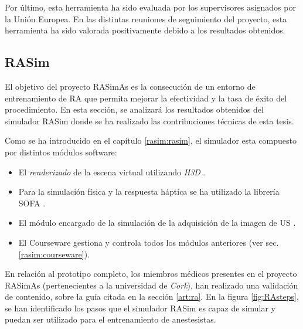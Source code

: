 Por último, esta herramienta ha sido evaluada por los supervisores asignados por la Unión Europea. En las distintas reuniones de seguimiento del proyecto, esta herramienta ha sido valorada positivamente debido a los resultados obtenidos.




\subsection{RASim}
\label{result:rasim}

El objetivo del proyecto \ac{RASimAs} es la consecución de un entorno de entrenamiento de \ac{RA} que permita mejorar la efectividad y la tasa de éxito del procedimiento.  En esta sección, se analizará los resultados obtenidos del simulador \ac{RASim} donde se ha realizado las contribuciones técnicas de esta tesis.

Como se ha introducido en el capítulo \ref{rasim:rasim}, el simulador esta compuesto por distintos módulos software:

\begin{itemize}
    \item El \emph{renderizado} de la escena virtual utilizando \emph{H3D} \cite{sensegraphics2012open}.
    \item Para la simulación física y la respuesta háptica\cite{needleinsertion} se ha utilizado la librería \ac{SOFA} \cite{sofaweb}.
    \item El módulo encargado de la simulación de la adquisición de la imagen de \ac{US} \cite{Law2015}.
    \item El \ac{Courseware} gestiona y controla todos los módulos anteriores (ver sec. \ref{rasim:courseware}).
\end{itemize}


En relación al prototipo completo, los miembros médicos presentes en el proyecto \ac{RASimAs} (pertenecientes a la universidad de \emph{Cork}), han realizado una validación de contenido, sobre la guía citada en la sección \ref{art:ra}. En la figura \ref{fig:RAsteps}, se han identificado los pasos que el simulador \ac{RASim} es capaz de simular y puedan ser utilizado para el entrenamiento de anestesistas. %


